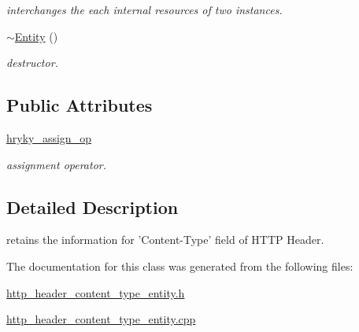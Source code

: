 \begin{DoxyCompactItemize}
\begin{DoxyCompactList}\small\item\em interchanges the each internal resources of two instances. \end{DoxyCompactList}\item 
\hypertarget{classhryky_1_1http_1_1header_1_1content_1_1type_1_1_entity_a02ce05c5cef03d32ca5077f10cfbbd8f}{\hyperlink{classhryky_1_1http_1_1header_1_1content_1_1type_1_1_entity_a02ce05c5cef03d32ca5077f10cfbbd8f}{$\sim$\-Entity} ()}\label{classhryky_1_1http_1_1header_1_1content_1_1type_1_1_entity_a02ce05c5cef03d32ca5077f10cfbbd8f}

\begin{DoxyCompactList}\small\item\em destructor. \end{DoxyCompactList}\end{DoxyCompactItemize}
\subsection*{Public Attributes}
\begin{DoxyCompactItemize}
\item 
\hypertarget{classhryky_1_1http_1_1header_1_1content_1_1type_1_1_entity_aea857f69790ee48493937e161a6e269d}{\hyperlink{classhryky_1_1http_1_1header_1_1content_1_1type_1_1_entity_aea857f69790ee48493937e161a6e269d}{hryky\-\_\-assign\-\_\-op}}\label{classhryky_1_1http_1_1header_1_1content_1_1type_1_1_entity_aea857f69790ee48493937e161a6e269d}

\begin{DoxyCompactList}\small\item\em assignment operator. \end{DoxyCompactList}\end{DoxyCompactItemize}


\subsection{Detailed Description}
retains the information for 'Content-\/\-Type' field of H\-T\-T\-P Header. 

The documentation for this class was generated from the following files\-:\begin{DoxyCompactItemize}
\item 
\hyperlink{http__header__content__type__entity_8h}{http\-\_\-header\-\_\-content\-\_\-type\-\_\-entity.\-h}\item 
\hyperlink{http__header__content__type__entity_8cpp}{http\-\_\-header\-\_\-content\-\_\-type\-\_\-entity.\-cpp}\end{DoxyCompactItemize}
